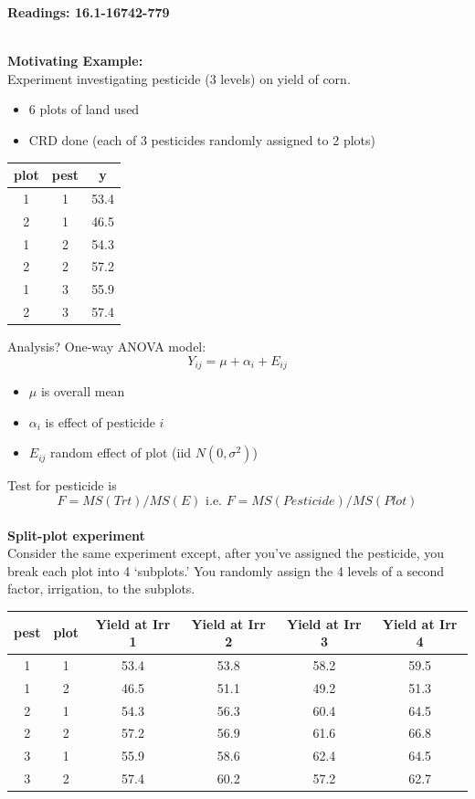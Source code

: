 \begin{center}\large\textbf{Readings: 16.1-16742-779}\\
\normalsize \end{center}
\large \hlinewd{2pt}
~\\

\textbf{Motivating Example:}\\
Experiment investigating pesticide (3 levels) on yield of corn.  
\begin{itemize}
\item 6 plots of land used
\item CRD done (each of 3 pesticides randomly assigned to 2 plots)
\end{itemize}

\begin{center}
\begin{tabular}{ccc}
plot &    pest &     y\\\hline
1&        1 &    53.4\\
2&        1 &    46.5\\
1&        2 &    54.3\\
2 &       2 &    57.2\\
1 &       3 &    55.9\\
2  &      3 &    57.4\\
\end{tabular}
\end{center}

Analysis?  One-way ANOVA model:
$$Y_{ij}=\mu+\alpha_{i}+E_{ij}$$
\begin{itemize}
\item $\mu$ is overall mean
\item $\alpha_i$ is effect of pesticide $i$
\item $E_{ij}$ random effect of plot (iid $N(0,\sigma^2)$)
\end{itemize}
Test for pesticide is
$$F=MS(Trt)/MS(E)\mbox{  i.e.  }F=MS(Pesticide)/MS(Plot)$$~\\

\textbf{Split-plot experiment}\\
Consider the same experiment except, after you've assigned the pesticide, you break each plot into 4 `subplots.'  You randomly assign the 4 levels of a second factor, irrigation, to the subplots.\\
\begin{center}
\begin{tabular}{cccccc}
pest &   plot &    Yield at Irr 1 &    Yield at Irr 2 &     Yield at Irr 3 &     Yield at Irr 4\\\hline
1 &      1   &     53.4 &   53.8 &   58.2  &  59.5\\
1 &      2  &      46.5 &   51.1 &   49.2  &  51.3\\
2 &      1  &      54.3 &   56.3 &   60.4  &  64.5\\
2 &      2  &      57.2 &   56.9 &   61.6  &  66.8\\
3 &      1  &      55.9 &   58.6 &   62.4  &  64.5\\
3 &      2  &      57.4  &  60.2 &   57.2  &  62.7\\
\end{tabular}
\end{center}

